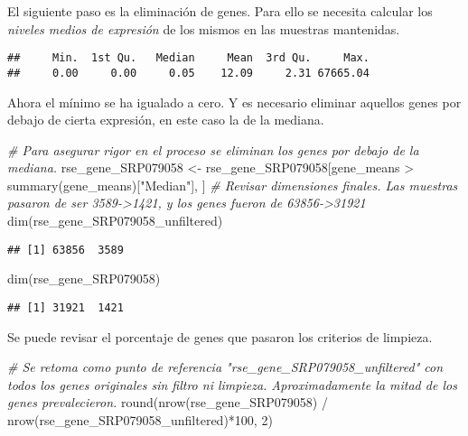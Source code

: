 \documentclass[
]{article}
\newenvironment{Shaded}{\begin{snugshade}}{\end{snugshade}}
\newcommand{\CommentTok}[1]{\textcolor[rgb]{0.56,0.35,0.01}{\textit{#1}}}
\newcommand{\DecValTok}[1]{\textcolor[rgb]{0.00,0.00,0.81}{#1}}
\newcommand{\FunctionTok}[1]{\textcolor[rgb]{0.00,0.00,0.00}{#1}}
\newcommand{\NormalTok}[1]{#1}
\newcommand{\OtherTok}[1]{\textcolor[rgb]{0.56,0.35,0.01}{#1}}
\newcommand{\SpecialCharTok}[1]{\textcolor[rgb]{0.00,0.00,0.00}{#1}}
\newcommand{\StringTok}[1]{\textcolor[rgb]{0.31,0.60,0.02}{#1}}
\begin{document}
El siguiente paso es la eliminación de genes. Para ello se necesita
calcular los \emph{niveles medios de expresión} de los mismos en las
muestras mantenidas.

\begin{verbatim}
##     Min.  1st Qu.   Median     Mean  3rd Qu.     Max. 
##     0.00     0.00     0.05    12.09     2.31 67665.04
\end{verbatim}

Ahora el mínimo se ha igualado a cero. Y es necesario eliminar aquellos
genes por debajo de cierta expresión, en este caso la de la mediana.

\begin{Shaded}
\begin{Highlighting}[]
\CommentTok{\# Para asegurar rigor en el proceso se eliminan los genes por debajo de la mediana.}
\NormalTok{rse\_gene\_SRP079058 }\OtherTok{\textless{}{-}}\NormalTok{ rse\_gene\_SRP079058[gene\_means }\SpecialCharTok{\textgreater{}} \FunctionTok{summary}\NormalTok{(gene\_means)[}\StringTok{"Median"}\NormalTok{], ]}
\CommentTok{\# Revisar dimensiones finales. Las muestras pasaron de ser 3589{-}\textgreater{}1421, y los genes fueron de 63856{-}\textgreater{}31921}
\FunctionTok{dim}\NormalTok{(rse\_gene\_SRP079058\_unfiltered)}
\end{Highlighting}
\end{Shaded}

\begin{verbatim}
## [1] 63856  3589
\end{verbatim}

\begin{Shaded}
\begin{Highlighting}[]
\FunctionTok{dim}\NormalTok{(rse\_gene\_SRP079058)}
\end{Highlighting}
\end{Shaded}

\begin{verbatim}
## [1] 31921  1421
\end{verbatim}

Se puede revisar el porcentaje de genes que pasaron los criterios de
limpieza.

\begin{Shaded}
\begin{Highlighting}[]
\CommentTok{\# Se retoma como punto de referencia "rse\_gene\_SRP079058\_unfiltered" con todos los genes originales sin filtro ni limpieza. Aproximadamente la mitad de los genes prevalecieron.}
\FunctionTok{round}\NormalTok{(}\FunctionTok{nrow}\NormalTok{(rse\_gene\_SRP079058) }\SpecialCharTok{/} \FunctionTok{nrow}\NormalTok{(rse\_gene\_SRP079058\_unfiltered)}\SpecialCharTok{*}\DecValTok{100}\NormalTok{, }\DecValTok{2}\NormalTok{)}
\end{Highlighting}
\end{Shaded}
\end{document}
